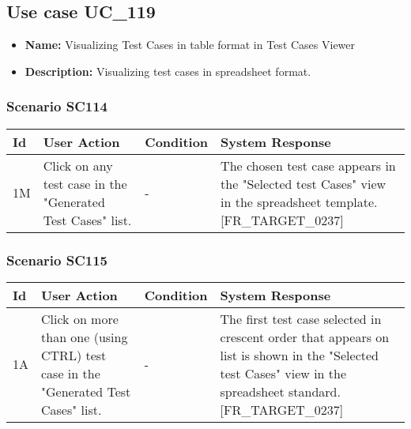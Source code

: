 \documentclass[a4paper,11pt]{article}
\newcommand{\bl}{\\ \hline}
\begin{document}
\subsection*{Use case UC_119}
\begin{itemize}
\item {\bf Name: }Visualizing Test Cases in table format in Test Cases Viewer
			
\item {\bf Description: }Visualizing test cases in spreadsheet format.
			
\end{itemize}
\subsubsection*{Scenario SC114}
\begin{tabular}{|p{0.4in}|p{1.5in}|p{1.5in}|p{1.5in}|}
\hline
Id & User Action & Condition & System Response \bl 
1M & Click on any test case in the "Generated Test Cases" list.
					 & - & The chosen test case appears in the "Selected test Cases"
						view in the spreadsheet template. [FR_TARGET_0237]\bl
\end{tabular}
\subsubsection*{Scenario SC115}
\begin{tabular}{|p{0.4in}|p{1.5in}|p{1.5in}|p{1.5in}|}
\hline
Id & User Action & Condition & System Response \bl 
1A & Click on more than one (using CTRL) test case in the
						"Generated Test Cases" list. & - & The first test case selected in crescent order that
						appears on list is shown in the "Selected test Cases" view in the
						spreadsheet standard. [FR_TARGET_0237]\bl
\end{tabular}
\end{document}
